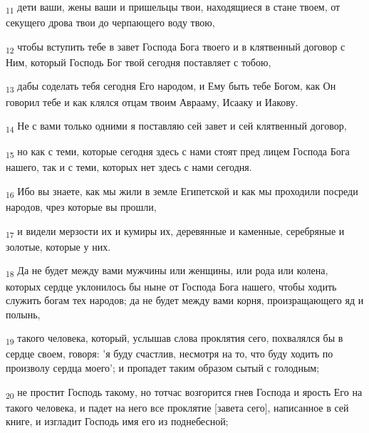 \begin{tcolorbox}
\textsubscript{11} дети ваши, жены ваши и пришельцы твои, находящиеся в стане твоем, от секущего дрова твои до черпающего воду твою,
\end{tcolorbox}
\begin{tcolorbox}
\textsubscript{12} чтобы вступить тебе в завет Господа Бога твоего и в клятвенный договор с Ним, который Господь Бог твой сегодня поставляет с тобою,
\end{tcolorbox}
\begin{tcolorbox}
\textsubscript{13} дабы соделать тебя сегодня Его народом, и Ему быть тебе Богом, как Он говорил тебе и как клялся отцам твоим Аврааму, Исааку и Иакову.
\end{tcolorbox}
\begin{tcolorbox}
\textsubscript{14} Не с вами только одними я поставляю сей завет и сей клятвенный договор,
\end{tcolorbox}
\begin{tcolorbox}
\textsubscript{15} но как с теми, которые сегодня здесь с нами стоят пред лицем Господа Бога нашего, так и с теми, которых нет здесь с нами сегодня.
\end{tcolorbox}
\begin{tcolorbox}
\textsubscript{16} Ибо вы знаете, как мы жили в земле Египетской и как мы проходили посреди народов, чрез которые вы прошли,
\end{tcolorbox}
\begin{tcolorbox}
\textsubscript{17} и видели мерзости их и кумиры их, деревянные и каменные, серебряные и золотые, которые у них.
\end{tcolorbox}
\begin{tcolorbox}
\textsubscript{18} Да не будет между вами мужчины или женщины, или рода или колена, которых сердце уклонилось бы ныне от Господа Бога нашего, чтобы ходить служить богам тех народов; да не будет между вами корня, произращающего яд и полынь,
\end{tcolorbox}
\begin{tcolorbox}
\textsubscript{19} такого человека, который, услышав слова проклятия сего, похвалялся бы в сердце своем, говоря: 'я буду счастлив, несмотря на то, что буду ходить по произволу сердца моего'; и пропадет таким образом сытый с голодным;
\end{tcolorbox}
\begin{tcolorbox}
\textsubscript{20} не простит Господь такому, но тотчас возгорится гнев Господа и ярость Его на такого человека, и падет на него все проклятие [завета сего], написанное в сей книге, и изгладит Господь имя его из поднебесной;
\end{tcolorbox}
